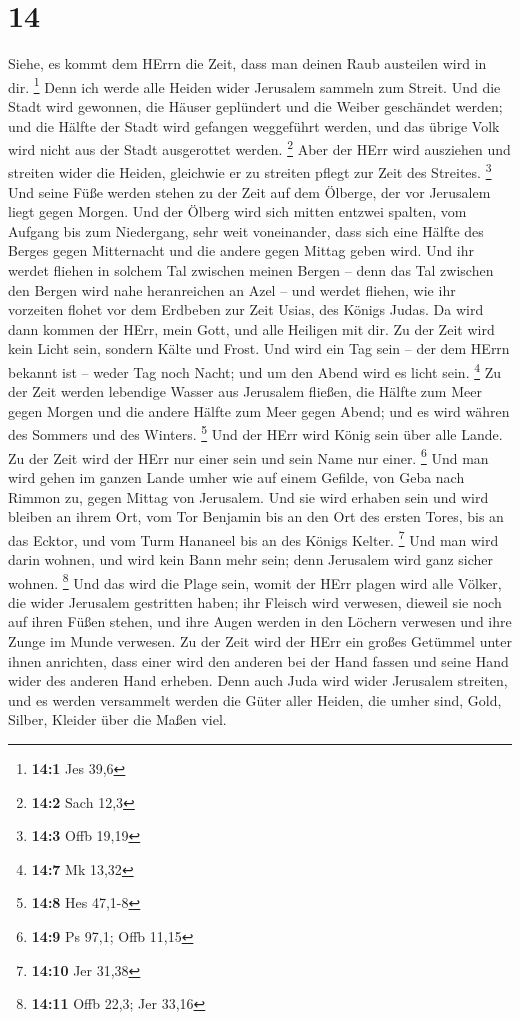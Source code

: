 \hypertarget{section-13}{%
\section{14}\label{section-13}}

 Siehe, es kommt dem HErrn die Zeit, dass man deinen Raub
austeilen wird in dir. \footnote{\textbf{14:1} Jes 39,6} 
Denn ich werde alle Heiden wider Jerusalem sammeln zum Streit. Und die
Stadt wird gewonnen, die Häuser geplündert und die Weiber geschändet
werden; und die Hälfte der Stadt wird gefangen weggeführt werden, und
das übrige Volk wird nicht aus der Stadt ausgerottet werden. \footnote{\textbf{14:2}
  Sach 12,3}  Aber der HErr wird ausziehen und streiten
wider die Heiden, gleichwie er zu streiten pflegt zur Zeit des Streites.
\footnote{\textbf{14:3} Offb 19,19}  Und seine Füße werden
stehen zu der Zeit auf dem Ölberge, der vor Jerusalem liegt gegen
Morgen. Und der Ölberg wird sich mitten entzwei spalten, vom Aufgang bis
zum Niedergang, sehr weit voneinander, dass sich eine Hälfte des Berges
gegen Mitternacht und die andere gegen Mittag geben wird. 
Und ihr werdet fliehen in solchem Tal zwischen meinen Bergen -- denn das
Tal zwischen den Bergen wird nahe heranreichen an Azel -- und werdet
fliehen, wie ihr vorzeiten flohet vor dem Erdbeben zur Zeit Usias, des
Königs Judas. Da wird dann kommen der HErr, mein Gott, und alle Heiligen
mit dir.  Zu der Zeit wird kein Licht sein, sondern Kälte
und Frost.  Und wird ein Tag sein -- der dem HErrn bekannt
ist -- weder Tag noch Nacht; und um den Abend wird es licht sein.
\footnote{\textbf{14:7} Mk 13,32}  Zu der Zeit werden
lebendige Wasser aus Jerusalem fließen, die Hälfte zum Meer gegen Morgen
und die andere Hälfte zum Meer gegen Abend; und es wird währen des
Sommers und des Winters. \footnote{\textbf{14:8} Hes 47,1-8}
 Und der HErr wird König sein über alle Lande. Zu der Zeit
wird der HErr nur einer sein und sein Name nur einer. \footnote{\textbf{14:9}
  Ps 97,1; Offb 11,15}  Und man wird gehen im ganzen
Lande umher wie auf einem Gefilde, von Geba nach Rimmon zu, gegen Mittag
von Jerusalem. Und sie wird erhaben sein und wird bleiben an ihrem Ort,
vom Tor Benjamin bis an den Ort des ersten Tores, bis an das Ecktor, und
vom Turm Hananeel bis an des Königs Kelter. \footnote{\textbf{14:10} Jer
  31,38}  Und man wird darin wohnen, und wird kein Bann
mehr sein; denn Jerusalem wird ganz sicher wohnen. \footnote{\textbf{14:11}
  Offb 22,3; Jer 33,16}  Und das wird die Plage sein,
womit der HErr plagen wird alle Völker, die wider Jerusalem gestritten
haben; ihr Fleisch wird verwesen, dieweil sie noch auf ihren Füßen
stehen, und ihre Augen werden in den Löchern verwesen und ihre Zunge im
Munde verwesen.  Zu der Zeit wird der HErr ein großes
Getümmel unter ihnen anrichten, dass einer wird den anderen bei der Hand
fassen und seine Hand wider des anderen Hand erheben. 
Denn auch Juda wird wider Jerusalem streiten, und es werden versammelt
werden die Güter aller Heiden, die umher sind, Gold, Silber, Kleider
über die Maßen viel.

